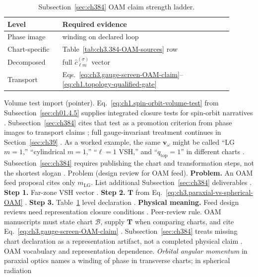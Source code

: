 \begin{table}[t]
\centering
\caption{Subsection~\ref{sec:ch384} OAM claim strength ladder.}
\label{tab:ch3.384-claim-ladder}
\small
\begin{tabular}{@{}p{0.22\linewidth}p{0.68\linewidth}@{}}
\toprule
Level & Required evidence \\
\midrule
Phase image & winding on declared loop \\
Chart-specific & Table~\ref{tab:ch3.384-OAM-sources} row \\
Decomposed & full \(\widehat{c}_{\ell m}^{(\sigma)}\) vector \\
Transport & Eqs.~\eqref{eq:ch3.gauge-screen-OAM-claim}--\eqref{eq:ch1.topology-qualified-gate} \\
\bottomrule
\end{tabular}
\end{table}
Volume test import (pointer). Eq.~\eqref{eq:ch1.spin-orbit-volume-test} from Subsection~\ref{sec:ch01.4.5} supplies integrated closure tests for spin-orbit narratives
\cite{belinfante1940}. Subsection~\ref{sec:ch384} cites that test as a promotion criterion from phase images to transport claims
\cite{harrington2001}; full gauge-invariant treatment continues in Section~\ref{sec:ch39} \cite{belinfante1940}.
As a worked example, the same \(\mathbf{v}_\omega\) might be called ``LG \(m=1\),'' ``cylindrical \(m=1\),'' ``\(\ell=1\) VSH,'' and ``\(q_{\mathrm{top}}=1\)''
in different charts \cite{allen1992}. Subsection~\ref{sec:ch384} requires publishing the chart and
transformation steps, not the shortest slogan \cite{harrington2001}.
Problem (design review for OAM feed). \textbf{Problem.} An OAM feed proposal cites only \(m_{\mathrm{LG}}\). List additional Subsection~\ref{sec:ch384} deliverables
\cite{allen1992}.
\textbf{Step 1.} Far-zone VSH vector \cite{hansen1988}.
\textbf{Step 2.} \(\mathbf{T}\) from Eq.~\eqref{eq:ch3.paraxial-vs-spherical-OAM} \cite{harrington2001}.
\textbf{Step 3.} Table~\ref{tab:ch3.384-claim-ladder} level declaration \cite{belinfante1940}.
\textbf{Physical meaning.} Feed design reviews need representation closure conditions \cite{stratton1941}.
Peer-review rule. OAM manuscripts must state chart \(\mathcal{B}\), supply \(\mathbf{T}\) when comparing charts, and cite Eq.~\eqref{eq:ch3.gauge-screen-OAM-claim}
\cite{belinfante1940}. Subsection~\ref{sec:ch384} treats missing chart declaration as a representation
artifact, not a completed physical claim \cite{harrington2001}.
OAM vocabulary and representation dependence. \emph{Orbital angular momentum} in paraxial optics names a winding of phase in transverse charts; in spherical radiation

